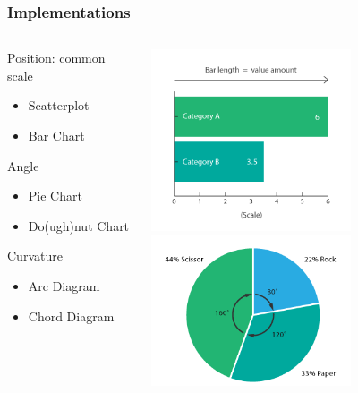 \begin{frame}
  \frametitle{Implementations}
  \begin{columns}[T]
    \begin{column}{6cm}  
      \begin{alertblock}{Position: common scale}
        \begin{itemize}
          \item Scatterplot
          \item Bar Chart
        \end{itemize}
      \end{alertblock}
      \begin{block}{Angle}
        \begin{itemize}
          \item Pie Chart
          \item Do(ugh)nut Chart
        \end{itemize}  
      \end{block}
      \begin{alertblock}{Curvature}
        \begin{itemize}
          \item Arc Diagram
          \item Chord Diagram
        \end{itemize}
      \end{alertblock}
      \end{column}
    \begin{column}{4cm}  
      \includegraphics[width=0.65\textwidth]{images/bar_chart} \\
      \includegraphics[width=0.65\textwidth]{images/pie_chart} \\

\end{column}
\end{columns}
\end{frame}
